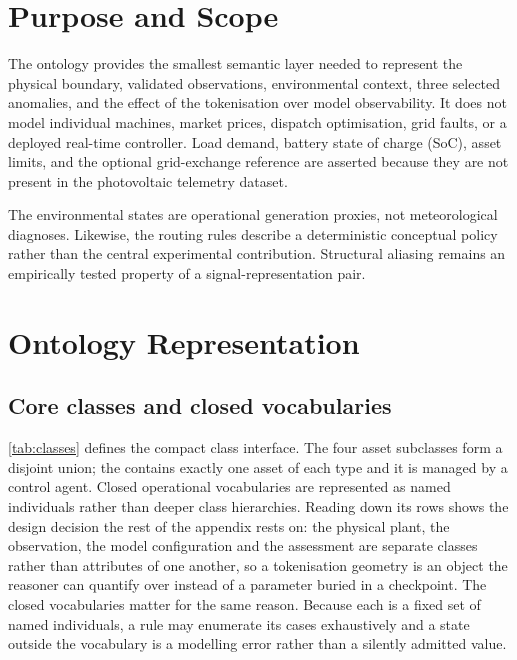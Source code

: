 \section{Purpose and Scope}

The ontology provides the smallest semantic layer needed to represent the physical boundary, validated observations, environmental context, three selected anomalies, and the effect of the tokenisation over model observability. It does not model individual machines, market prices, dispatch optimisation, grid faults, or a deployed real-time controller. Load demand, battery state of charge (SoC), asset limits, and the optional grid-exchange reference are asserted because they are not present in the photovoltaic telemetry dataset.

The environmental states are operational generation proxies, not meteorological diagnoses. Likewise, the routing rules describe a deterministic conceptual policy rather than the central experimental contribution. Structural aliasing remains an empirically tested property of a signal-representation pair.

\section{Ontology Representation}

\subsection{Core classes and closed vocabularies}

\autoref{tab:classes} defines the compact class interface. The four asset subclasses form a disjoint union; the  contains exactly one asset of each type and it is managed by a control agent. Closed operational vocabularies are represented as named individuals rather than deeper class hierarchies. Reading down its rows shows the design decision the rest of the appendix rests on: the physical plant, the observation, the model configuration and the assessment are separate classes rather than attributes of one another, so a tokenisation geometry is an object the reasoner can quantify over instead of a parameter buried in a checkpoint. The closed vocabularies matter for the same reason. Because each is a fixed set of named individuals, a rule may enumerate its cases exhaustively and a state outside the vocabulary is a modelling error rather than a silently admitted value.




